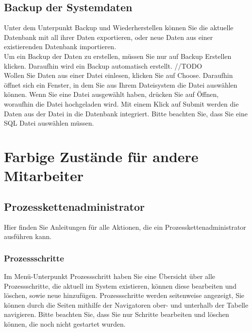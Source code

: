 \documentclass[enabledeprecatedfontcommands,fontsize=12pt,paper=a4,twoside]{scrartcl}
\begin{document}
\subsection{Backup der Systemdaten}
Unter dem Unterpunkt Backup und Wiederherstellen können Sie die aktuelle Datenbank mit all ihrer Daten exportieren, oder neue Daten aus einer existierenden Datenbank importieren. \\

Um ein Backup der Daten zu erstellen, müssen Sie nur auf Backup Erstellen klicken. Daraufhin wird ein Backup automatisch erstellt. //TODO \\

Wollen Sie Daten aus einer Datei einlesen, klicken Sie auf Choose. Daraufhin öffnet sich ein Fenster, in dem Sie aus Ihrem Dateisystem die Datei auswählen können. Wenn Sie eine Datei ausgewählt haben, drücken Sie auf Öffnen, woraufhin die Datei hochgeladen wird. Mit einem Klick auf Submit werden die Daten aus der Datei in die Datenbank integriert. Bitte beachten Sie, dass  Sie eine SQL Datei auswählen müssen. \\ 


\newpage
\section{Farbige Zustände für andere Mitarbeiter}
\subsection{Prozesskettenadministrator}

Hier finden Sie Anleitungen für alle Aktionen, die ein Prozesskettenadministrator ausführen kann.
\subsubsection{Prozessschritte}

Im Menü-Unterpunkt Prozessschritt haben Sie eine Übersicht über alle Prozessschritte, die aktuell im System existieren, können diese bearbeiten und löschen, sowie neue hinzufügen. Prozessschritte werden seitenweise angezeigt, Sie können durch die Seiten mithilfe der Navigatoren ober- und unterhalb der Tabelle navigieren. Bitte beachten Sie, dass Sie nur Schritte bearbeiten und löschen können, die noch nicht gestartet wurden. \\
\end{document}
